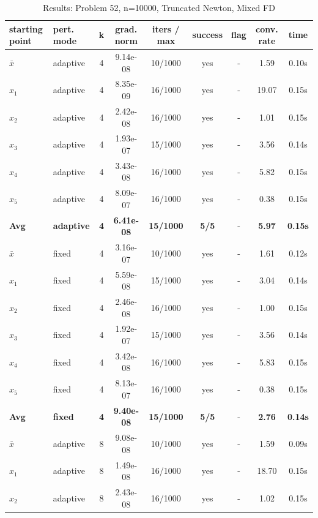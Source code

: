 \begin{longtable}{|l|l|c|c|c|c|c|c|c|}
\caption{Results: Problem 52, n=10000, Truncated Newton, Mixed FD} \\
\hline
\textbf{starting point} & \textbf{pert. mode} & \textbf{k} & \textbf{grad. norm} & \textbf{iters / max} & \textbf{success} & \textbf{flag} & \textbf{conv. rate} & \textbf{time} \\
\hline
\endfirsthead
\endhead
\endfoot
\hline
\endlastfoot
$\bar{x}$ & adaptive & 4 & 9.14e-08 & 10/1000 & yes & - & 1.59 & 0.10s \\
\hline
$x_1$ & adaptive & 4 & 8.35e-09 & 16/1000 & yes & - & 19.07 & 0.15s \\
\hline
$x_2$ & adaptive & 4 & 2.42e-08 & 16/1000 & yes & - & 1.01 & 0.15s \\
\hline
$x_3$ & adaptive & 4 & 1.93e-07 & 15/1000 & yes & - & 3.56 & 0.14s \\
\hline
$x_4$ & adaptive & 4 & 3.43e-08 & 16/1000 & yes & - & 5.82 & 0.15s \\
\hline
$x_5$ & adaptive & 4 & 8.09e-07 & 16/1000 & yes & - & 0.38 & 0.15s \\
\hline
\hline\hline
\textbf{Avg} & \textbf{adaptive} & \textbf{4} & \textbf{6.41e-08} & \textbf{15/1000} & \textbf{5/5} & - & \textbf{5.97} & \textbf{0.15s} \\
\hline\hline
\hline
$\bar{x}$ & fixed & 4 & 3.16e-07 & 10/1000 & yes & - & 1.61 & 0.12s \\
\hline
$x_1$ & fixed & 4 & 5.59e-08 & 15/1000 & yes & - & 3.04 & 0.14s \\
\hline
$x_2$ & fixed & 4 & 2.46e-08 & 16/1000 & yes & - & 1.00 & 0.15s \\
\hline
$x_3$ & fixed & 4 & 1.92e-07 & 15/1000 & yes & - & 3.56 & 0.14s \\
\hline
$x_4$ & fixed & 4 & 3.42e-08 & 16/1000 & yes & - & 5.83 & 0.15s \\
\hline
$x_5$ & fixed & 4 & 8.13e-07 & 16/1000 & yes & - & 0.38 & 0.15s \\
\hline
\hline\hline
\textbf{Avg} & \textbf{fixed} & \textbf{4} & \textbf{9.40e-08} & \textbf{15/1000} & \textbf{5/5} & - & \textbf{2.76} & \textbf{0.14s} \\
\hline\hline
$\bar{x}$ & adaptive & 8 & 9.08e-08 & 10/1000 & yes & - & 1.59 & 0.09s \\
\hline
$x_1$ & adaptive & 8 & 1.49e-08 & 16/1000 & yes & - & 18.70 & 0.15s \\
\hline
$x_2$ & adaptive & 8 & 2.43e-08 & 16/1000 & yes & - & 1.02 & 0.15s \\

\end{longtable}
